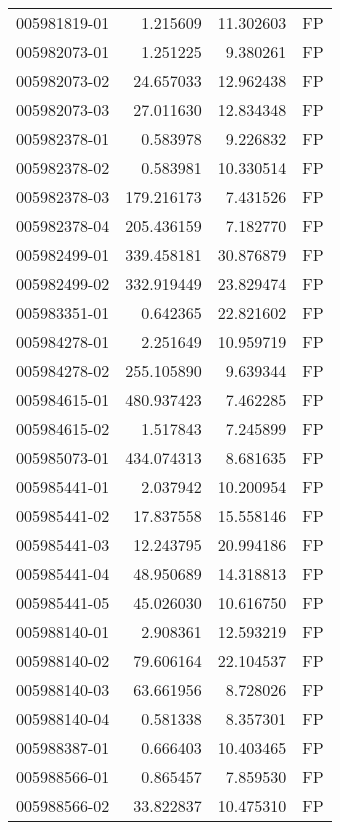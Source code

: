 \begin{tabular}{lrrl}
005981819-01 &    1.215609 &      11.302603 &   FP \\
005982073-01 &    1.251225 &       9.380261 &   FP \\
005982073-02 &   24.657033 &      12.962438 &   FP \\
005982073-03 &   27.011630 &      12.834348 &   FP \\
005982378-01 &    0.583978 &       9.226832 &   FP \\
005982378-02 &    0.583981 &      10.330514 &   FP \\
005982378-03 &  179.216173 &       7.431526 &   FP \\
005982378-04 &  205.436159 &       7.182770 &   FP \\
005982499-01 &  339.458181 &      30.876879 &   FP \\
005982499-02 &  332.919449 &      23.829474 &   FP \\
005983351-01 &    0.642365 &      22.821602 &   FP \\
005984278-01 &    2.251649 &      10.959719 &   FP \\
005984278-02 &  255.105890 &       9.639344 &   FP \\
005984615-01 &  480.937423 &       7.462285 &   FP \\
005984615-02 &    1.517843 &       7.245899 &   FP \\
005985073-01 &  434.074313 &       8.681635 &   FP \\
005985441-01 &    2.037942 &      10.200954 &   FP \\
005985441-02 &   17.837558 &      15.558146 &   FP \\
005985441-03 &   12.243795 &      20.994186 &   FP \\
005985441-04 &   48.950689 &      14.318813 &   FP \\
005985441-05 &   45.026030 &      10.616750 &   FP \\
005988140-01 &    2.908361 &      12.593219 &   FP \\
005988140-02 &   79.606164 &      22.104537 &   FP \\
005988140-03 &   63.661956 &       8.728026 &   FP \\
005988140-04 &    0.581338 &       8.357301 &   FP \\
005988387-01 &    0.666403 &      10.403465 &   FP \\
005988566-01 &    0.865457 &       7.859530 &   FP \\
005988566-02 &   33.822837 &      10.475310 &   FP \\

\end{tabular}
